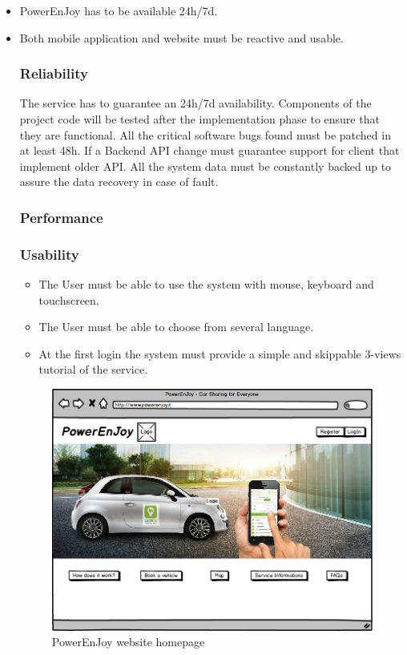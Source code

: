 \begin{itemize}
	\item PowerEnJoy has to be available 24h/7d.
	\item Both mobile application and website must be reactive and usable.
	
\subsubsection{Reliability}%

The service has to guarantee an 24h/7d availability. Components of the project code will be tested after the implementation phase to ensure that they are functional. 
All the critical software bugs found must be patched in at least 48h.
If a Backend API change must guarantee support for client that implement older API.
All the system data must be constantly backed up to assure the data recovery in case of fault.


\subsubsection{Performance}

\subsubsection{Usability}
\begin{itemize}
	\item The User must be able to use the system with mouse, keyboard and touchscreen.
	\item The User must be able to choose from several language.
	\item At the first login the system must provide a simple and skippable 3-views tutorial of the service.
\end{itemize}

\begin{figure}[h]
	\centering
\includegraphics[scale=0.4]{img/webhome}
	\caption{PowerEnJoy website homepage}
\end{figure}
\FloatBarrier




\end{itemize}

